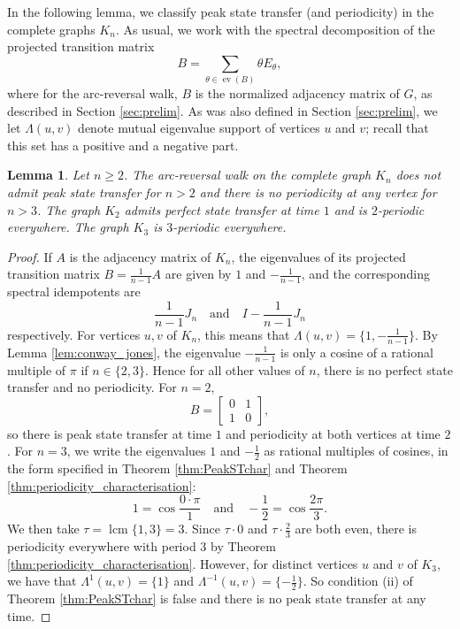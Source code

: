 \documentclass{article}
\newtheorem{lemma}[theorem]{Lemma}
\numberwithin{equation}{section}
\DeclareMathOperator\ev{ev}
\DeclareMathOperator{\lcm}{lcm}
\begin{document}
In the following lemma, we classify peak state transfer (and periodicity) in the complete graphs $K_n$. As usual, we work with the spectral decomposition of the projected transition matrix
\[
B = \sum_{\theta \in \ev(B)} \theta E_\theta,
\]
where for the arc-reversal walk, $B$ is the normalized adjacency matrix of $G$, as described in Section \ref{sec:prelim}. As was also defined in Section \ref{sec:prelim}, we let $\Lambda(u,v)$ denote mutual eigenvalue support of vertices $u$ and $v$; recall that this set has a positive and a negative part.
\begin{lemma}
\label{lem:complete_graphs_peakST}
Let $n\geq 2$. The arc-reversal walk on the complete graph $K_n$ does not admit peak state transfer for $n > 2$ and there is no periodicity at any vertex for $n>3$. The graph $K_2$ admits perfect state transfer at time $1$ and is $2$-periodic everywhere. The graph $K_3$ is $3$-periodic everywhere.
\end{lemma}
\begin{proof}
If $A$ is the adjacency matrix of $K_n$, the eigenvalues of its projected transition matrix $B = \frac{1}{n-1}A$ are given by $1$ and $-\frac{1}{n-1}$, and the corresponding spectral idempotents are
\[
\frac{1}{n-1}J_n \quad \text{and} \quad I - \frac{1}{n-1}J_n
\]
respectively. For vertices $u,v$ of $K_n$, this means that $\Lambda(u,v) = \{1,-\frac{1}{n-1}\}$. By Lemma \ref{lem:conway_jones}, the eigenvalue $-\frac{1}{n-1}$ is only a cosine of a rational multiple of $\pi$ if $n \in \{2,3\}$. Hence for all other values of $n$, there is no perfect state transfer and no periodicity. For $n = 2$,
\[
B = \begin{bmatrix}
0 & 1 \\
1 & 0
\end{bmatrix},
\]
so there is peak state transfer at time $1$ and periodicity at both vertices at time $2$. For $n = 3$, we write the eigenvalues $1$ and $-\frac{1}{2}$ as rational multiples of cosines, in the form specified in Theorem \ref{thm:PeakSTchar} and Theorem \ref{thm:periodicity_characterisation}:
\[
1 = \cos\frac{0\cdot \pi}{1} \quad \text{and} \quad -\frac{1}{2} = \cos\frac{2\pi}{3}.
\]
We then take $\tau = \lcm\{1,3\} =3$. Since $\tau \cdot 0$ and $\tau \cdot \frac{2}{3}$ are both even, there is periodicity everywhere with period $3$ by Theorem \ref{thm:periodicity_characterisation}. However, for distinct vertices $u$ and $v$ of $K_3$, we have that $\Lambda^1(u,v) = \{1\}$ and $\Lambda^{-1}(u,v)= \{-\frac{1}{2}\}$. So condition (ii) of Theorem \ref{thm:PeakSTchar} is false and there is no peak state transfer at any time.
\end{proof}
\end{document}
